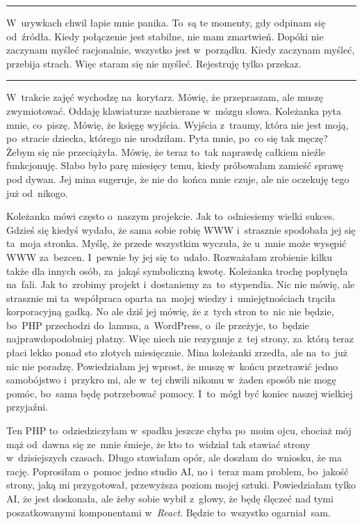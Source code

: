 \documentclass[9pt, a5paper]{memoir}
\begin{document}
\fancybreak{* \quad * \quad *}

W~urywkach chwil łapie mnie panika. To~są te momenty, gdy odpinam się od~źródła. Kiedy połączenie jest stabilne, nie mam zmartwień. Dopóki nie zaczynam myśleć racjonalnie, wszystko jest w~porządku. Kiedy zaczynam myśleć, przebija strach. Więc staram się nie myśleć. Rejestruję tylko przekaz.

\fancybreak{* \quad * \quad *}

W~trakcie zajęć wychodzę na~korytarz. Mówię, że przepraszam, ale muszę zwymiotować. Oddaję klawiaturze nazbierane w~mózgu słowa. Koleżanka pyta mnie, co~piszę. Mówię, że księgę wyjścia. Wyjścia z~traumy, która nie jest moją, po~stracie dziecka, którego nie urodziłam. Pyta mnie, po~co się tak męczę? Żebym się nie przeciążyła. Mówię, że teraz to~tak naprawdę całkiem nieźle funkcjonuję. Słabo było parę miesięcy temu, kiedy próbowałam zamieść sprawę pod dywan. Jej mina sugeruje, że nie do~końca mnie czuje, ale nie oczekuję tego już od~nikogo.

Koleżanka mówi często o~naszym projekcie. Jak to~odniesiemy wielki sukces. Gdzieś się kiedyś wydało, że sama sobie robię WWW i~strasznie spodobała jej się ta~moja stronka. Myślę, że przede wszystkim wyczuła, że u~mnie może wysępić WWW za~bezcen. I~pewnie by jej się to~udało. Rozważałam zrobienie kilku także dla innych osób, za~jakąś symboliczną kwotę. Koleżanka trochę popłynęła na~fali. Jak to~zrobimy projekt i~dostaniemy za~to~stypendia. Nic nie mówię, ale strasznie mi ta~współpraca oparta na~mojej wiedzy i~umiejętnościach trąciła korporacyjną gadką. No ale dziś jej mówię, że z~tych stron to~nic nie będzie, bo~PHP przechodzi do~lamusa, a~WordPress, o~ile przeżyje, to~będzie najprawdopodobniej płatny. Więc niech nie rezygnuje z~tej strony, za~którą teraz płaci lekko ponad sto złotych miesięcznie. Mina koleżanki zrzedła, ale na~to~już nic nie poradzę. Powiedziałam jej wprost, że muszę w~końcu przetrawić jedno samobójstwo i~przykro mi, ale w~tej chwili nikomu w~żaden sposób nie mogę pomóc, bo~sama będę potrzebować pomocy. I~to~mógł być koniec naszej wielkiej przyjaźni.

Ten PHP to~odziedziczyłam w~spadku jeszcze chyba po~moim ojcu, chociaż mój mąż od~dawna się ze~mnie śmieje, że kto to~widział tak stawiać strony w~dzisiejszych czasach. Długo stawiałam opór, ale doszłam do~wniosku, że ma rację. Poprosiłam o~pomoc jedno studio AI, no i~teraz mam problem, bo~jakość strony, jaką mi przygotował, przewyższa poziom mojej sztuki. Powiedziałam tylko AI, że jest doskonała, ale żeby sobie wybił z~głowy, że będę ślęczeć nad tymi poszatkowanymi komponentami w~\textit{React}. Będzie to~wszystko ogarniał~sam.
\end{document}
